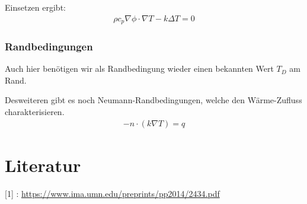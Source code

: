 \documentclass[pdflatex,12pt,a4paper,twoside]{scrartcl}
\begin{document}
Einsetzen ergibt:
\begin{align*}
\rho c_p \nabla \phi \cdot \nabla T - k\Delta T=0
\end{align*}

\subsubsection{Randbedingungen}
Auch hier benötigen wir als Randbedingung wieder einen bekannten Wert $T_D$ am Rand.

Desweiteren gibt es noch Neumann-Randbedingungen, welche den Wärme-Zufluss charakterisieren. 
\begin{align*}
-n \cdot (k\nabla T)=q
\end{align*} 


\section{Literatur}
[1] : \url{https://www.ima.umn.edu/preprints/pp2014/2434.pdf}
\end{document}
